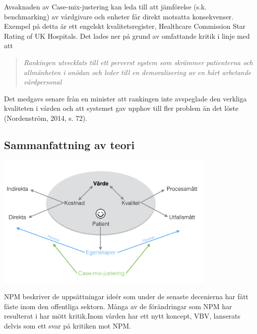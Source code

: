 Avsaknaden av Case-mix-justering kan leda till att jämförelse (s.k. benchmarking) av vårdgivare och enheter får direkt motsatta konsekvenser. Exempel på detta är ett engelskt kvalitetsregister, Healthcare Commission Star Rating of UK Hospitals. Det lades ner på grund av omfattande kritik i linje med att 
\begin{quotation}
\textit{Rankingen utvecklats till ett perverst system som skrämmer patienterna och allmänheten i onödan och leder till en demoralisering av en hårt arbetande vårdpersonal}
\end{quotation}
Det medgavs senare från en minister att rankingen inte avspeglade den verkliga kvaliteten i vården och att systemet gav upphov till fler problem än det löste (Nordenström, 2014, s. 72).

\subsection{Sammanfattning av teori}

\noindent\begin{minipage}{\textwidth}
\centering
\includegraphics[width=0.8\textwidth]{varde}
\label{tab:varde}            
\end{minipage}

\vspace{10 mm}

NPM beskriver de uppsättningar ideér som under de senaste decenierna har fått fäste inom den offentliga sektorn. Många av de förändringar som NPM har resulterat i har mött kritik.Inom vården har ett nytt koncept, VBV, lanserats delvis som ett svar på kritiken mot NPM. 


